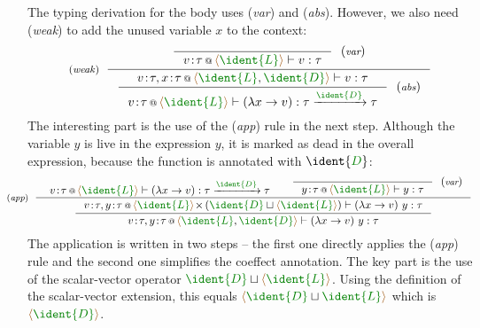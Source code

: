 The typing derivation for the body uses (\emph{var}) and (\emph{abs}). However, we also need (\emph{weak})
to add the unused variable $x$ to the context:
%
\begin{equation*}
\tyrule{weak}
{ \tyruler{var}
    {}
    { \coctx{v\!:\!\tau}{\alift{ \cclrd{\ident{L}} }} \vdash v : \tau } }
{ \tyruler{abs}
    { \coctx{v\!:\!\tau, x\!:\!\tau}{\alift{ \cclrd{\ident{L}},\cclrd{\ident{D}} }} \vdash v : \tau }
    { \coctx{v\!:\!\tau}{\alift{ \cclrd{\ident{L}} }} \vdash (\lambda x \rightarrow v) : \tau \xrightarrow{\cclrd{\ident{D}}} \tau }}
\end{equation*}
%
The interesting part is the use of the (\emph{app}) rule in the next step. Although the variable $y$ is live in the expression $y$,
it is marked as dead in the overall expression, because the function is annotated with $\ident{\cclrd{D}}$:
%
\begin{equation*}
\hspace{-2em}
\tyrule{app}
  {
    \begin{array}{l}
    \vspace{-1.2em}
    \coctx{v\!:\!\tau}{\alift{ \cclrd{\ident{L}} }} \vdash (\lambda x \rightarrow v) : \tau \xrightarrow{\cclrd{\ident{D}}} \tau 
    \end{array} &
    \tyruler{var}{}{\coctx{y\!:\!\tau}{\alift{ \cclrd{\ident{L}} }} \vdash y : \tau}
  }
  { 
  \inference
  	{ \coctx{v\!:\!\tau, y\!:\!\tau}{\alift{ \cclrd{\ident{L}} } \cons\, ({ \cclrd{\ident{D}} \sqcup \alift{\cclrd{\ident{L}}} })} 
  	     \vdash (\lambda x \rightarrow v)~y : \tau }
  	{ \coctx{v\!:\!\tau, y\!:\!\tau}{\alift{ \cclrd{\ident{L}}, \cclrd{\ident{D}} }} \vdash (\lambda x \rightarrow v)~y : \tau }  	
  }
\end{equation*}
%
The application is written in two steps -- the first one directly applies the (\emph{app}) rule
and the second one simplifies the coeffect annotation. The key part is the use of the scalar-vector 
operator $\cclrd{\ident{D}} \sqcup \alift{\cclrd{\ident{L}}}$. Using the definition of the scalar-vector
extension, this equals $\alift{\cclrd{\ident{D}} \sqcup \cclrd{\ident{L}}}$ which is
$\alift{\cclrd{\ident{D}}}$.


